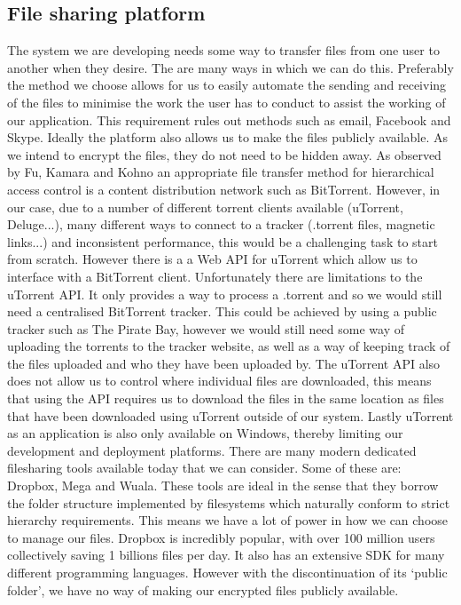 \documentclass[12pt, titlepage]{article}
\begin{document}
\subsection{File sharing platform}
The system we are developing needs some way to transfer files from one user to another when they desire. The are many ways in which we can do this. Preferably the method we choose allows for us to easily automate the sending and receiving of the files to minimise the work the user has to conduct to assist the working of our application. This requirement rules out methods such as email, Facebook and Skype. Ideally the platform also allows us to make the files publicly available. As we intend to encrypt the files, they do not need to be hidden away.
\newline \indent As observed by Fu, Kamara and Kohno an appropriate file transfer method for hierarchical access control is a content distribution network such as BitTorrent.\cite{bittorrent} However, in our case, due to a number of different torrent clients available (uTorrent, Deluge...), many different ways to connect to a tracker (.torrent files, magnetic links...) and inconsistent performance, this would be a challenging task to start from scratch. However there is a a Web API for uTorrent which allow us to interface with a BitTorrent client.\cite{http://www.utorrent.com/community/developers/webapi} Unfortunately there are limitations to the uTorrent API. It only provides a way to process a .torrent and so we would still need a centralised BitTorrent tracker. This could be achieved by using a public tracker such as The Pirate Bay, however we would still need some way of uploading the torrents to the tracker website, as well as a way of keeping track of the files uploaded and who they have been uploaded by. The uTorrent API also does not allow  us to control where individual files are downloaded, this means that using the API requires us to download the files in the same location as files that have been downloaded using uTorrent outside of our system. Lastly uTorrent as an application is also only available on Windows, thereby limiting our development and deployment platforms.
\newline \indent There are many modern dedicated filesharing tools available today that we can consider. Some of these are: Dropbox, Mega and Wuala. These tools are ideal in the sense that they borrow the folder structure implemented by filesystems which naturally conform to strict hierarchy requirements. This means we have a lot of power in how we can choose to manage our files. Dropbox is incredibly popular, with over 100 million users collectively saving 1 billions files per day.\cite{dropboxInfo} It also has an extensive SDK for many different programming languages. However with the discontinuation of its `public folder'\cite{dropboxPublicFolder}, we have no way of making our encrypted files publicly available.
\end{document}
